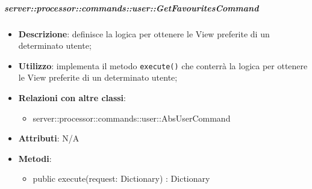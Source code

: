         \subparagraph{server::processor::commands::user::GetFavouritesCommand} %
        \label{subp:bdsm_app_server_processor_commands_user_getfavouritescommand}
        \begin{itemize}
          \item \textbf{Descrizione}: definisce la logica per ottenere le View preferite di un determinato utente;
          \item \textbf{Utilizzo}: implementa il metodo \texttt{execute()} che conterrà la logica per ottenere le View preferite di un determinato utente;
          \item \textbf{Relazioni con altre classi}:
            \begin{itemize}
              \item server::processor::commands::user::AbsUserCommand
            \end{itemize}
			\item \textbf{Attributi}: N/A
			\item \textbf{Metodi}:
        	\begin{itemize}
          		\item public execute(request: Dictionary) : Dictionary
        	\end{itemize}
        \end{itemize}

